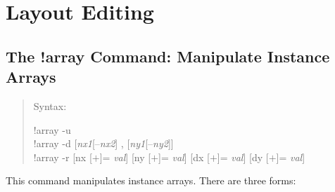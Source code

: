 \section{Layout Editing}

\subsection{The {\cb !array} Command: Manipulate Instance Arrays}
\begin{quote}
Syntax: \parbox[t]{5in}{
    {\vt !array -u}\\
    {\vt !array -d} [{\it nx1\/}[--{\it nx2\/}] , [{\it ny1\/}[--{\it ny2\/}]]\\
    {\vt !array -r} [{\vt nx} [$+$]= {\it val\/}]
      [{\vt ny} [$+$]= {\it val\/}]
      [{\vt dx} [$+$]= {\it val\/}] [{\vt dy} [$+$]= {\it val\/}]
}
\end{quote}

This command manipulates instance arrays.  There are three forms:
        
